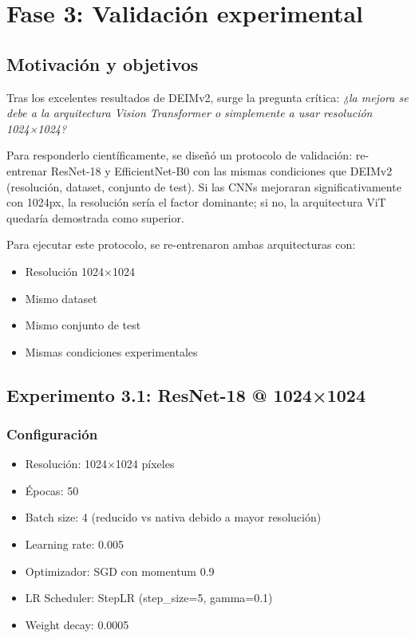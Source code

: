 \FloatBarrier
\section{Fase 3: Validación experimental}
\label{sec:fase3}

\subsection{Motivación y objetivos}

Tras los excelentes resultados de DEIMv2, surge la pregunta crítica: \textit{¿la mejora se debe a la arquitectura Vision Transformer o simplemente a usar resolución 1024×1024?}

Para responderlo científicamente, se diseñó un protocolo de validación: re-entrenar ResNet-18 y EfficientNet-B0 con las mismas condiciones que DEIMv2 (resolución, dataset, conjunto de test). Si las CNNs mejoraran significativamente con 1024px, la resolución sería el factor dominante; si no, la arquitectura ViT quedaría demostrada como superior.

Para ejecutar este protocolo, se re-entrenaron ambas arquitecturas con:
\begin{itemize}
    \item Resolución 1024×1024
    \item Mismo dataset
    \item Mismo conjunto de test
    \item Mismas condiciones experimentales
\end{itemize}

\subsection{Experimento 3.1: ResNet-18 @ 1024×1024}

\subsubsection{Configuración}

\begin{itemize}
    \item Resolución: 1024×1024 píxeles
    \item Épocas: 50
    \item Batch size: 4 (reducido vs nativa debido a mayor resolución)
    \item Learning rate: 0.005
    \item Optimizador: SGD con momentum 0.9
    \item LR Scheduler: StepLR (step\_size=5, gamma=0.1)
    \item Weight decay: 0.0005
\end{itemize}


